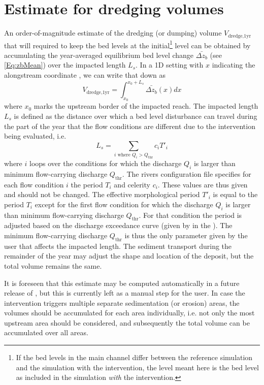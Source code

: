 \section{Estimate for dredging volumes}\label{Sec:DredgeVol}

An order-of-magnitude estimate of the dredging (or dumping) volume $V_\text{dredge,1yr}$ that will required to keep the bed levels at the initial\footnote{If the bed levels in the main channel differ between the reference simulation and the simulation with the intervention, the level meant here is the bed level as included in the simulation \emph{with} the intervention.} level can be obtained by accumulating the year-averaged equilibrium bed level change $\bar{\Delta z_b}$ (see \autoref{Eq:zbMean}) over the impacted length $L_s$.
In a 1D setting with $x$ indicating the alongstream coordinate , we can write that down as
%
\begin{equation}
V_\text{dredge,1yr} = \int_{x_0}^{x_0 + L_s} \bar{\Delta z_b}(x) dx
\end{equation}
%
where $x_0$ marks the upstream border of the impacted reach.
The impacted length $L_s$ is defined as the distance over which a bed level disturbance can travel during the part of the year that the flow conditions are different due to the intervention being evaluated, i.e.
%
\begin{equation}
L_s = \sum_{i \text{ where $Q_i > Q_\text{thr}$}} c_i T'_i
\end{equation}
%
where $i$ loops over the conditions for which the discharge $Q_i$ is larger than minimum flow-carrying discharge $Q_\text{thr}$.
The rivers configuration file specifies for each flow condition $i$ the period $T_i$ and celerity $c_i$.
These values are thus given and should not be changed.
The effective morphological period $T'_i$ is equal to the period $T_i$ except for the first flow condition for which the discharge $Q_i$ is larger than minimum flow-carrying discharge $Q_\text{thr}$.
For that condition the period is adjusted based on the discharge exceedance curve (given by  in the ).
The minimum flow-carrying discharge $Q_\text{thr}$ is thus the only parameter given by the user that affects the impacted length.
The sediment transport during the remainder of the year may adjust the shape and location of the deposit, but the total volume remains the same.

It is foreseen that this estimate may be computed automatically in a future release of \dfmi, but this is currently left as a manual step for the user.
In case the intervention triggers multiple separate sedimentation (or erosion) areas, the volumes should be accumulated for each area individually, i.e. not only the most upstream area should be considered, and subsequently the total volume can be accumulated over all areas.
